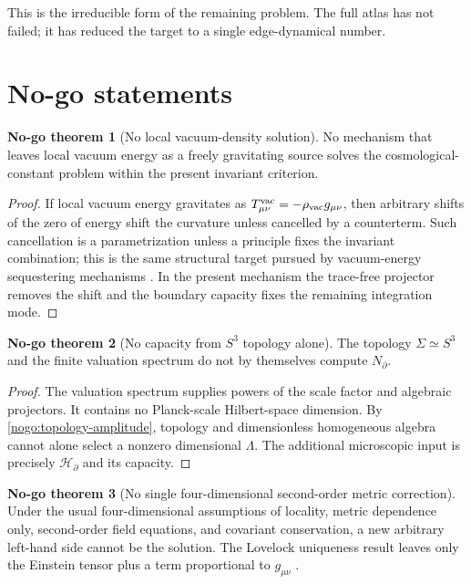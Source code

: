 \documentclass[aps,prd,reprint,nofootinbib,superscriptaddress,floatfix]{revtex4-2}
\numberwithin{equation}{section}
\theoremstyle{definition}
\newtheorem{nogotheorem}{No-go theorem}[section]
\theoremstyle{plain}
\newcommand{\Ncap}{N_{\partial}}
\begin{document}
This is the irreducible form of the remaining problem.  The full atlas has
not failed; it has reduced the target to a single edge-dynamical number.

\section{No-go statements}

\begin{nogotheorem}[No local vacuum-density solution]\label{nogo:vacuum-density}
No mechanism that leaves local vacuum energy as a freely gravitating source solves the cosmological-constant problem within the present invariant criterion.
\end{nogotheorem}

\begin{proof}
If local vacuum energy gravitates as \(T^{\rm vac}_{\mu\nu}=-\rho_{\rm vac}g_{\mu\nu}\), then arbitrary shifts of the zero of energy shift the curvature unless cancelled by a counterterm.  Such cancellation is a parametrization unless a principle fixes the invariant combination; this is the same structural target pursued by vacuum-energy sequestering mechanisms \cite{KaloperPadilla2014}.  In the present mechanism the trace-free projector removes the shift and the boundary capacity fixes the remaining integration mode.
\end{proof}

\begin{nogotheorem}[No capacity from \(S^3\) topology alone]\label{nogo:no-topology-capacity}
The topology \(\Sigma\simeq S^3\) and the finite valuation spectrum do not by themselves compute \(\Ncap\).
\end{nogotheorem}

\begin{proof}
The valuation spectrum supplies powers of the scale factor and algebraic projectors.  It contains no Planck-scale Hilbert-space dimension.  By \cref{nogo:topology-amplitude}, topology and dimensionless homogeneous algebra cannot alone select a nonzero dimensional \(\Lambda\).  The additional microscopic input is precisely \(\mathcal H_\partial\) and its capacity.
\end{proof}

\begin{nogotheorem}[No single four-dimensional second-order metric correction]\label{nogo:lovelock}
Under the usual four-dimensional assumptions of locality, metric dependence only, second-order field equations, and covariant conservation, a new arbitrary left-hand side cannot be the solution.  The Lovelock uniqueness result leaves only the Einstein tensor plus a term proportional to \(g_{\mu\nu}\) \cite{Lovelock1971,Curiel2016,PadmanabhanKothawala2013}.
\end{nogotheorem}
\end{document}
